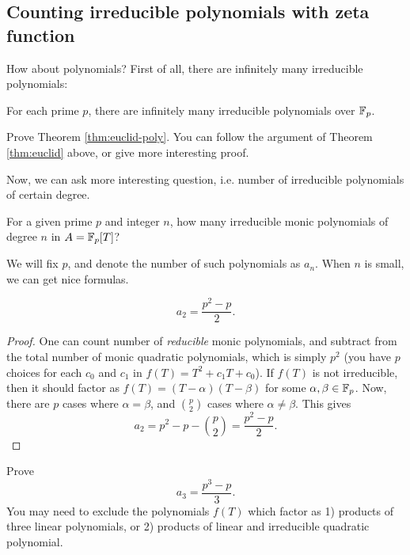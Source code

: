 \subsection{Counting irreducible polynomials with zeta function}
\label{subsec:counting-irred-poly-zeta}

How about polynomials?
First of all, there are infinitely many irreducible polynomials:
\begin{theorem}
    \label{thm:euclid-poly}
    For each prime $p$, there are infinitely many irreducible polynomials over $\mathbb{F}_p$.
\end{theorem}

\begin{exercise}
    Prove Theorem \ref{thm:euclid-poly}. You can follow the argument of Theorem \ref{thm:euclid} above, or give more interesting proof.
\end{exercise}

Now, we can ask more interesting question, i.e. number of irreducible polynomials of certain degree.
\begin{myquote}
    For a given prime $p$ and integer $n$, how many irreducible monic polynomials of degree $n$ in $A = \mathbb{F}_p[T]$?
\end{myquote}
We will fix $p$, and denote the number of such polynomials as $a_n$.
When $n$ is small, we can get nice formulas.
\begin{proposition}
    \label{prop:monic_irred_n2}
    \begin{equation}
        a_2 = \frac{p^2 - p}{2}.
        \label{eqn:monic_irred_n2}
    \end{equation}
\end{proposition}
\begin{proof}
    One can count number of \emph{reducible} monic polynomials, and subtract from the total number of monic quadratic polynomials, which is simply $p^2$ (you have $p$ choices for each $c_0$ and $c_1$ in $f(T) = T^2 + c_1 T + c_0$).
    If $f(T)$ is not irreducible, then it should factor as $f(T) = (T - \alpha)(T - \beta)$ for some $\alpha, \beta \in \mathbb{F}_p$.
    Now, there are $p$ cases where $\alpha = \beta$, and $\binom{p}{2}$ cases where $\alpha \ne \beta$.
    This gives
    \[
    a_2 = p^2 - p - \binom{p}{2} = \frac{p^2 - p}{2}.
    \]
\end{proof}
\begin{exercise}
    Prove
    \begin{equation}
        a_3 = \frac{p^3 - p}{3}.
        \label{eqn:monic_irred_n3}
    \end{equation}
    You may need to exclude the polynomials $f(T)$ which factor as 1) products of three linear polynomials, or 2) products of linear and irreducible quadratic polynomial.
\end{exercise}

